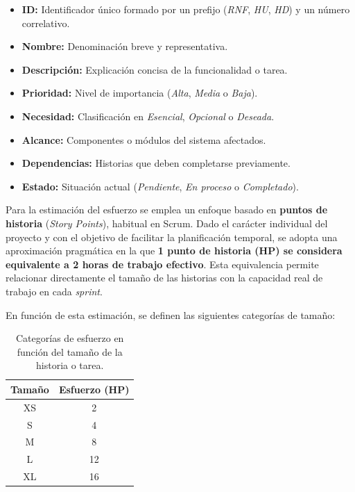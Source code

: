 \documentclass{report}
\begin{document}
\begin{itemize} 
  \item \textbf{ID:} Identificador único formado por un prefijo (\emph{RNF}, \emph{HU}, \emph{HD}) y un número correlativo.  
  \item \textbf{Nombre:} Denominación breve y representativa.  
  \item \textbf{Descripción:} Explicación concisa de la funcionalidad o tarea.  
  \item \textbf{Prioridad:} Nivel de importancia (\textit{Alta}, \textit{Media} o \textit{Baja}).  
  \item \textbf{Necesidad:} Clasificación en \textit{Esencial}, \textit{Opcional} o \textit{Deseada}.  
  \item \textbf{Alcance:} Componentes o módulos del sistema afectados.  
  \item \textbf{Dependencias:} Historias que deben completarse previamente.  
  \item \textbf{Estado:} Situación actual (\textit{Pendiente}, \textit{En proceso} o \textit{Completado}).  
\end{itemize}

Para la estimación del esfuerzo se emplea un enfoque basado en \textbf{puntos de historia} (\emph{Story Points}), habitual en Scrum. Dado el carácter individual del proyecto y con el objetivo de facilitar la planificación temporal, se adopta una aproximación pragmática en la que \textbf{1 punto de historia (HP) se considera equivalente a 2 horas de trabajo efectivo}. Esta equivalencia permite relacionar directamente el tamaño de las historias con la capacidad real de trabajo en cada \textit{sprint}.

En función de esta estimación, se definen las siguientes categorías de tamaño:

\begin{table}[H]
\centering
\begin{tabular}{|c|c|}
\hline
\textbf{Tamaño} & \textbf{Esfuerzo (HP)} \\ \hline
XS & 2 \\ \hline
S  & 4 \\ \hline
M  & 8 \\ \hline
L  & 12 \\ \hline
XL & 16 \\ \hline
\end{tabular}
\caption{Categorías de esfuerzo en función del tamaño de la historia o tarea.}
\end{table}
\end{document}
